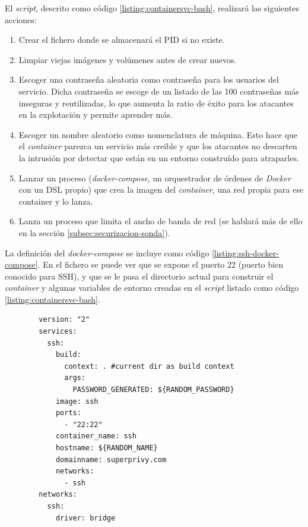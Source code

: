 
    
El \emph{script}, descrito como código \ref{listing:containersvc-bash}, realizará las siguientes acciones:

\begin{enumerate}
    \item Crear el fichero donde se almacenará el PID si no existe.
    \item Limpiar viejas imágenes y volúmenes antes de crear nuevos.
    \item Escoger una contraseña aleatoria como contraseña para los usuarios del servicio. Dicha
    contraseña se escoge de un listado de las 100 contraseñas más inseguras y reutilizadas, lo que aumenta
    la ratio de éxito para los atacantes en la explotación y permite aprender más.
    \item Escoger un nombre aleatorio como nomenclatura de máquina. Esto hace que el \emph{container} parezca un servicio
    más creible y que los atacantes no descarten la intrusión por detectar que están en un entorno construído para atraparles.
    \item Lanzar un proceso (\emph{docker-compose}, un orquestrador de órdenes de \emph{Docker} con un DSL propio) que crea la imagen del \emph{container}, una red propia para ese container y lo lanza. 
    \item Lanza un proceso que limita el ancho de banda de red (se hablará más de ello en la sección \ref{subsec:securizacion-sonda}).
\end{enumerate}

La definición del \emph{docker-compose} se incluye como código \ref{listing:ssh-docker-compose}. En el fichero se puede ver que se expone el puerto
22 (puerto bien conocido para SSH), y que se le pasa el directorio actual para construir el \emph{container} y algunas variables de entorno 
creadas en el \emph{script} listado como código \ref{listing:containersvc-bash}.

    \begin{verbatim}
        version: "2"
        services:
          ssh:
            build:
              context: . #current dir as build context
              args:
                PASSWORD_GENERATED: ${RANDOM_PASSWORD}
            image: ssh
            ports:
              - "22:22"
            container_name: ssh
            hostname: ${RANDOM_NAME}
            domainname: superprivy.com
            networks:
              - ssh
        networks:
          ssh:
            driver: bridge
    \end{verbatim}

